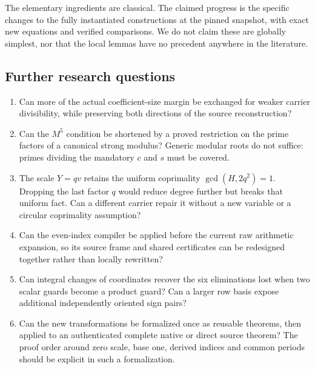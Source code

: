 \documentclass[11pt]{article}
\theoremstyle{definition}\newtheorem{definition}[theorem]{Definition}
\theoremstyle{remark}\newtheorem{remark}[theorem]{Remark}
\begin{document}
The elementary ingredients are classical. The claimed progress is the
specific changes to the fully instantiated constructions at the pinned
snapshot, with exact new equations and verified comparisons. We do not
claim these are globally simplest, nor that the local lemmas have no
precedent anywhere in the literature.

\subsection{Further research questions}
\begin{enumerate}
\item Can more of the actual coefficient-size margin be exchanged for
weaker carrier divisibility, while preserving both directions of the
source reconstruction?
\item Can the $M^5$ condition be shortened by a proved restriction on the
prime factors of a canonical strong modulus? Generic modular roots do
not suffice: primes dividing the mandatory $c$ and $s$ must be covered.
\item The scale $Y=qv$ retains the uniform coprimality
$\gcd(H,2q^2)=1$. Dropping the last factor $q$ would reduce degree
further but breaks that uniform fact. Can a different carrier repair it
without a new variable or a circular coprimality assumption?
\item Can the even-index compiler be applied before the current raw
arithmetic expansion, so its source frame and shared certificates can be
redesigned together rather than locally rewritten?
\item Can integral changes of coordinates recover the six eliminations
lost when two scalar guards become a product guard? Can a larger row
basis expose additional independently oriented sign pairs?
\item Can the new transformations be formalized once as reusable
theorems, then applied to an authenticated complete native or direct
source theorem? The proof order around zero scale, base one, derived
indices and common periods should be explicit in such a formalization.
\end{enumerate}

\appendix
\end{document}
